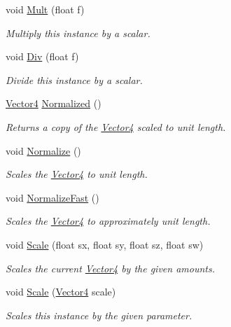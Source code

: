\begin{DoxyCompactItemize}
void \hyperlink{struct_open_t_k_1_1_vector4_a667f1af6fa4581d443ec95d579463587}{Mult} (float f)
\begin{DoxyCompactList}\small\item\em Multiply this instance by a scalar.\end{DoxyCompactList}\item 
void \hyperlink{struct_open_t_k_1_1_vector4_a90a5f15955b19e14842650f1b839ccbd}{Div} (float f)
\begin{DoxyCompactList}\small\item\em Divide this instance by a scalar.\end{DoxyCompactList}\item 
\hyperlink{struct_open_t_k_1_1_vector4}{Vector4} \hyperlink{struct_open_t_k_1_1_vector4_ae7a5cc09d7b9e73dd18a563316eb8dc8}{Normalized} ()
\begin{DoxyCompactList}\small\item\em Returns a copy of the \hyperlink{struct_open_t_k_1_1_vector4}{Vector4} scaled to unit length. \end{DoxyCompactList}\item 
void \hyperlink{struct_open_t_k_1_1_vector4_a176b7dac6beee2417726301d814676c9}{Normalize} ()
\begin{DoxyCompactList}\small\item\em Scales the \hyperlink{struct_open_t_k_1_1_vector4}{Vector4} to unit length. \end{DoxyCompactList}\item 
void \hyperlink{struct_open_t_k_1_1_vector4_a043f0c73d2ea91b55caecc605cea60d7}{Normalize\-Fast} ()
\begin{DoxyCompactList}\small\item\em Scales the \hyperlink{struct_open_t_k_1_1_vector4}{Vector4} to approximately unit length. \end{DoxyCompactList}\item 
void \hyperlink{struct_open_t_k_1_1_vector4_a4ea7cefaa9dfc52879b8771fb5b6274d}{Scale} (float sx, float sy, float sz, float sw)
\begin{DoxyCompactList}\small\item\em Scales the current \hyperlink{struct_open_t_k_1_1_vector4}{Vector4} by the given amounts. \end{DoxyCompactList}\item 
void \hyperlink{struct_open_t_k_1_1_vector4_ab07575d37303a64652ea17d72daf5196}{Scale} (\hyperlink{struct_open_t_k_1_1_vector4}{Vector4} scale)
\begin{DoxyCompactList}\small\item\em Scales this instance by the given parameter.\end{DoxyCompactList}\item 

\end{DoxyCompactItemize}
